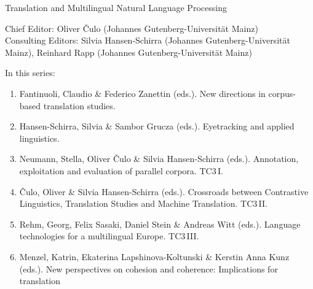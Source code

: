 {\large Translation and Multilingual Natural Language Processing}

\bigskip

Chief Editor: Oliver \v{C}ulo (Johannes Gutenberg-Universität Mainz) \\
Consulting Editors: Silvia Hansen-Schirra (Johannes Gutenberg-Universität Mainz), 
Reinhard Rapp (Johannes Gutenberg-Universität Mainz)

\bigskip

In this series:

\begin{enumerate}
\item Fantinuoli, Claudio \& Federico Zanettin (eds.). New directions in corpus-based translation studies.
\item Hansen-Schirra, Silvia \& Sambor Grucza (eds.). Eyetracking and applied linguistics.
\item Neumann, Stella, Oliver Čulo \& Silvia Hansen-Schirra (eds.). Annotation, exploitation and evaluation of parallel corpora. TC3\,I.
\item Čulo, Oliver  \& Silvia Hansen-Schirra (eds.). Crossroads between Contrastive Linguistics, Translation Studies and Machine Translation. TC3\,II.
\item Rehm, Georg, Felix Sasaki, Daniel Stein \& Andreas Witt (eds.). Language technologies for a multilingual Europe. TC3\,III.
\item Menzel, Katrin, Ekaterina Lapshinova-Koltunski \& Kerstin Anna Kunz  (eds.). New perspectives on cohesion and coherence: Implications for translation
\end{enumerate}

 
